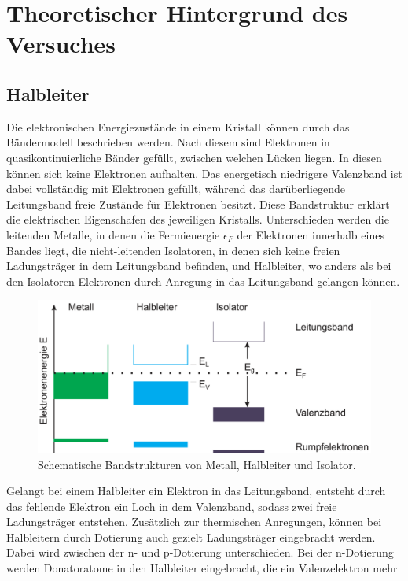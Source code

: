 \section{Theoretischer Hintergrund des Versuches}
\label{sec:Theorie}
\subsection{Halbleiter}
\label{sec:Halbleiter}
Die elektronischen Energiezustände in einem Kristall können durch das Bändermodell beschrieben werden. Nach diesem sind Elektronen in quasikontinuierliche
Bänder gefüllt, zwischen welchen Lücken liegen. In diesen können sich keine Elektronen aufhalten. Das energetisch niedrigere Valenzband ist dabei vollständig 
mit Elektronen gefüllt, während das darüberliegende Leitungsband freie Zustände für Elektronen besitzt. Diese Bandstruktur erklärt die elektrischen Eigenschafen
des jeweiligen Kristalls. Unterschieden werden die leitenden Metalle, in denen die Fermienergie $\epsilon_F$ der Elektronen innerhalb eines Bandes liegt,
die nicht-leitenden Isolatoren, in denen sich keine freien Ladungsträger in dem Leitungsband befinden, und Halbleiter, wo anders als bei den Isolatoren
Elektronen durch Anregung in das Leitungsband gelangen können. 
\begin{figure}[H]
    \centering
    \includegraphics[scale=0.4]{pictures/Bandstrukturen.png}
    \caption{Schematische Bandstrukturen von Metall, Halbleiter und Isolator. \cite{Halbleiter-Grundlagen}}
\end{figure}
\noindent
Gelangt bei einem Halbleiter ein Elektron in das Leitungsband, entsteht durch das fehlende Elektron ein Loch in dem Valenzband, sodass zwei freie 
Ladungsträger entstehen. Zusätzlich zur thermischen Anregungen, können bei Halbleitern durch Dotierung auch gezielt Ladungsträger eingebracht werden.
Dabei wird zwischen der n- und p-Dotierung unterschieden. Bei der n-Dotierung werden Donatoratome in den Halbleiter eingebracht, die ein Valenzelektron mehr

